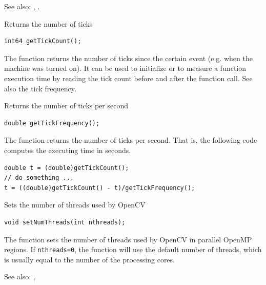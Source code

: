 See also: , .

\label{getTickCount}
Returns the number of ticks

\begin{lstlisting}
int64 getTickCount();
\end{lstlisting}

The function returns the number of ticks since the certain event (e.g. when the machine was turned on).
It can be used to initialize  or to measure a function execution time by reading the tick count before and after the function call. See also the tick frequency.

\label{getTickFrequency}
Returns the number of ticks per second

\begin{lstlisting}
double getTickFrequency();
\end{lstlisting}

The function returns the number of ticks per second.
That is, the following code computes the executing time in seconds.
\begin{lstlisting}
double t = (double)getTickCount();
// do something ...
t = ((double)getTickCount() - t)/getTickFrequency();
\end{lstlisting}

\label{setNumThreads}
Sets the number of threads used by OpenCV

\begin{lstlisting}
void setNumThreads(int nthreads);
\end{lstlisting}
\begin{description}
\end{description}

The function sets the number of threads used by OpenCV in parallel OpenMP regions. If \texttt{nthreads=0}, the function will use the default number of threads, which is usually equal to the number of the processing cores.

See also: , 
